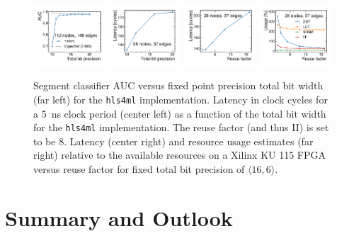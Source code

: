 \documentclass{article}
\newcommand{\hlsfml}{\texttt{hls4ml}\xspace}
\begin{document}
\begin{figure}[htpb]
    \centering
    \includegraphics[width=0.24\textwidth]{figures/AUC_vs_BP.pdf}
    \includegraphics[width=0.24\textwidth]{figures/Latency_vs_BP.pdf}    %
    \includegraphics[width=0.24\textwidth]{figures/Latency_vs_RF.pdf}
    \includegraphics[width=0.24\textwidth]{figures/Resources_vs_RF.pdf}
    \caption{Segment classifier AUC versus fixed point precision total bit width (far left) for the \hlsfml implementation. 
    Latency in clock cycles for a 5~ns clock period (center left) as a function of the total bit width for the \hlsfml implementation. 
    The reuse factor (and thus II) is set to be 8.
    Latency (center right) and resource usage estimates (far right) relative to the available resources on a Xilinx KU 115 FPGA versus reuse factor for fixed total bit precision of $\langle 16, 6\rangle$.}
    \label{fig:hlsfml_scan}
\end{figure}


\section{Summary and Outlook}
\label{sec:summary}
\end{document}
